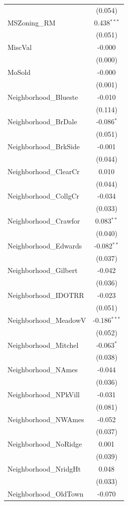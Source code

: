 \begin{table}[!htbp]
\begin{tabular}{@{\extracolsep{5pt}}lc}
& (0.054) \\
 MSZoning_RM & 0.438$^{***}$ \\
& (0.051) \\
 MiscVal & -0.000$^{}$ \\
& (0.000) \\
 MoSold & -0.000$^{}$ \\
& (0.001) \\
 Neighborhood_Blueste & -0.010$^{}$ \\
& (0.114) \\
 Neighborhood_BrDale & -0.086$^{*}$ \\
& (0.051) \\
 Neighborhood_BrkSide & -0.001$^{}$ \\
& (0.044) \\
 Neighborhood_ClearCr & 0.010$^{}$ \\
& (0.044) \\
 Neighborhood_CollgCr & -0.034$^{}$ \\
& (0.033) \\
 Neighborhood_Crawfor & 0.083$^{**}$ \\
& (0.040) \\
 Neighborhood_Edwards & -0.082$^{**}$ \\
& (0.037) \\
 Neighborhood_Gilbert & -0.042$^{}$ \\
& (0.036) \\
 Neighborhood_IDOTRR & -0.023$^{}$ \\
& (0.051) \\
 Neighborhood_MeadowV & -0.186$^{***}$ \\
& (0.052) \\
 Neighborhood_Mitchel & -0.063$^{*}$ \\
& (0.038) \\
 Neighborhood_NAmes & -0.044$^{}$ \\
& (0.036) \\
 Neighborhood_NPkVill & -0.031$^{}$ \\
& (0.081) \\
 Neighborhood_NWAmes & -0.052$^{}$ \\
& (0.037) \\
 Neighborhood_NoRidge & 0.001$^{}$ \\
& (0.039) \\
 Neighborhood_NridgHt & 0.048$^{}$ \\
& (0.033) \\
 Neighborhood_OldTown & -0.070$^{}$ \\

\end{tabular}
\end{table}
